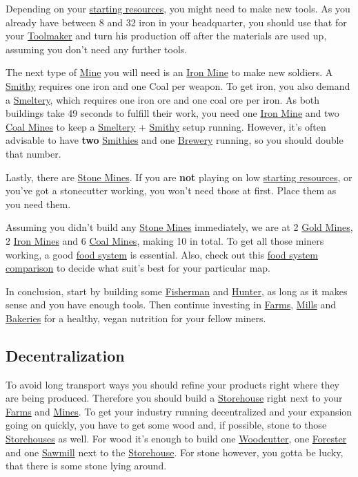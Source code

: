 \documentclass[12pt]{article}
\begin{document}
Depending on your \hyperref[sec:startresources]{starting resources}, you might need to make new tools. As you already have between 8 and 32 iron in your headquarter, you should use that for your \hyperref[sec:toolmaker]{Toolmaker} and turn his production off after the materials are used up, assuming you don't need any further tools.

The next type of \hyperref[sec:mine]{Mine} you will need is an \hyperref[sec:ironmine]{Iron Mine} to make new soldiers. A \hyperref[sec:smithy]{Smithy} requires one iron and one Coal per weapon. To get iron, you also demand a \hyperref[sec:smeltery]{Smeltery}, which requires one iron ore and one coal ore per iron. As both buildings take 49 seconds to fulfill their work, you need one \hyperref[sec:ironmine]{Iron Mine} and two \hyperref[sec:coalmine]{Coal Mines} to keep a \hyperref[sec:smeltery]{Smeltery} + \hyperref[sec:smithy]{Smithy} setup running. However, it's often advisable to have \textbf{two} \hyperref[sec:smithy]{Smithies} and one \hyperref[sec:brewery]{Brewery} running, so you should double that number.

Lastly, there are \hyperref[sec:stonemine]{Stone Mines}. If you are \textbf{not} playing on low \hyperref[sec:startresources]{starting resources}, or you've got a stonecutter working, you won't need those at first. Place them as you need them.

Assuming you didn't build any \hyperref[sec:stonemine]{Stone Mines} immediately, we are at 2 \hyperref[sec:goldmine]{Gold Mines}, 2 \hyperref[sec:ironmine]{Iron Mines} and 6 \hyperref[sec:coalmine]{Coal Mines}, making 10 in total. To get all those miners working, a good \hyperref[sec:foodsystems]{food system} is essential. Also, check out this \hyperref[sec:foodsystemcomparison]{food system comparison} to decide what suit's best for your particular map.

In conclusion, start by building some \hyperref[sec:fisherman]{Fisherman} and \hyperref[sec:hunter]{Hunter}, as long as it makes sense and you have enough tools.
Then continue investing in \hyperref[sec:farm]{Farms}, \hyperref[sec:mill]{Mills} and \hyperref[sec:bakery]{Bakeries} for a healthy, vegan nutrition for your fellow miners.

\subsection{Decentralization}
\label{sec:decentralization}

To avoid long transport ways you should refine your products right where they are being produced. Therefore you should build a \hyperref[sec:storehouse]{Storehouse} right next to your \hyperref[sec:farm]{Farms} and \hyperref[sec:mine]{Mines}. To get your industry running decentralized and your expansion going on quickly, you have to get some wood and, if possible, stone to those \hyperref[sec:storehouse]{Storehouses} as well. For wood it's enough to build one \hyperref[sec:woodcutter]{Woodcutter}, one \hyperref[sec:forester]{Forester} and one \hyperref[sec:sawmill]{Sawmill} next to the \hyperref[sec:storehouse]{Storehouse}. For stone however, you gotta be lucky, that there is some stone lying around.
\end{document}
